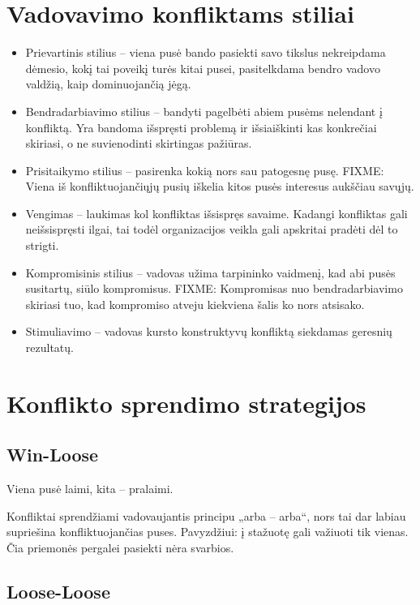 \section{Vadovavimo konfliktams stiliai}

\begin{itemize}
  \item Prievartinis stilius – viena pusė bando pasiekti savo
    tikslus nekreipdama dėmesio, kokį tai poveikį turės kitai
    pusei, pasitelkdama bendro vadovo valdžią, kaip dominuojančią
    jėgą.
  \item Bendradarbiavimo stilius – bandyti pagelbėti abiem pusėms
    nelendant į konfliktą. Yra bandoma išspręsti problemą ir
    išsiaiškinti kas konkrečiai skiriasi, o ne suvienodinti skirtingas
    pažiūras.
  \item Prisitaikymo stilius – pasirenka kokią nors sau patogesnę
    pusę. FIXME: Viena iš konfliktuojančiųjų pusių iškelia kitos
    pusės interesus aukščiau savųjų.
  \item Vengimas – laukimas kol konfliktas išsispręs savaime. Kadangi
    konfliktas gali neišsispręsti ilgai, tai todėl organizacijos veikla
    gali apskritai pradėti dėl to strigti.
  \item Kompromisinis stilius – vadovas užima tarpininko vaidmenį, kad
    abi pusės susitartų, siūlo kompromisus. FIXME: Kompromisas nuo
    bendradarbiavimo skiriasi tuo, kad kompromiso atveju kiekviena
    šalis ko nors atsisako.
  \item Stimuliavimo – vadovas kursto konstruktyvų konfliktą siekdamas
    geresnių rezultatų.
\end{itemize}

\section{Konflikto sprendimo strategijos}

\subsection{Win-Loose}

Viena pusė laimi, kita – pralaimi.

Konfliktai sprendžiami vadovaujantis principu „arba – arba“, nors tai
dar labiau supriešina konfliktuojančias puses. Pavyzdžiui: į stažuotę
gali važiuoti tik vienas. Čia priemonės pergalei pasiekti nėra
svarbios.

\subsection{Loose-Loose}

